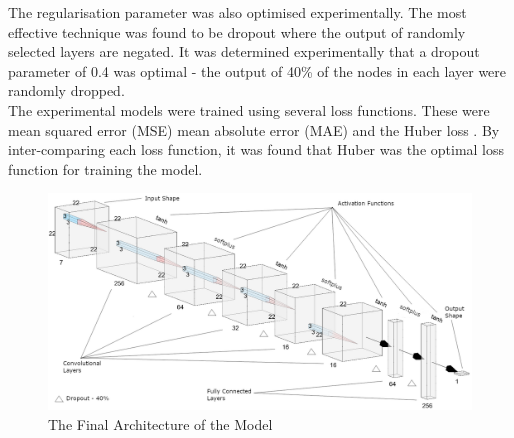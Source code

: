 \noindent
The regularisation parameter was also optimised experimentally. The most effective technique was found to be dropout \cite{srivastava2014dropout} where the output of randomly selected layers are negated. It was determined experimentally that a dropout parameter of 0.4 was optimal - the output of 40\% of the nodes in each layer were randomly dropped. 
\\

\noindent
The experimental models were trained using several loss functions. These were mean squared error (MSE) mean absolute error (MAE) and the Huber loss \cite{huber1964robust}. By inter-comparing each loss function, it was found that Huber was the optimal loss function for training the model.


\begin{figure}[h]
	\centering
	\includegraphics[scale=1.2]{Figures/architecture_final.png}
	\caption{The Final Architecture of the Model}
	\label{fig:model_architecture}
\end{figure} 

